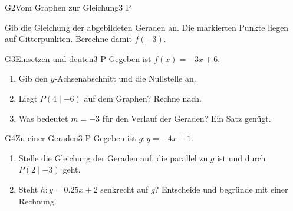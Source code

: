 \documentclass[11pt]{article}
\begin{document}
\begin{lpaufgabe}{G2}{Vom Graphen zur Gleichung}{3 P}
\begin{minipage}[t]{0.52\linewidth}
Gib die Gleichung der abgebildeten Geraden an. Die markierten Punkte liegen auf Gitterpunkten.
Berechne damit $f(-3)$.
\end{minipage}\hfill
\begin{minipage}[t]{0.42\linewidth}\vspace{0pt}\centering
{}
\end{minipage}
\end{lpaufgabe}

\begin{lpaufgabe}{G3}{Einsetzen und deuten}{3 P}
Gegeben ist $f(x) = -3x + 6$.
\begin{enumerate}[label=(\alph*),leftmargin=*,itemsep=1pt]
\item Gib den $y$-Achsenabschnitt und die Nullstelle an.
\item Liegt $P(4 \mid -6)$ auf dem Graphen? Rechne nach.
\item Was bedeutet $m = -3$ für den Verlauf der Geraden? Ein Satz genügt.
\end{enumerate}
\end{lpaufgabe}


\begin{lpaufgabe}{G4}{Zu einer Geraden}{3 P}
Gegeben ist $g: y = -4x + 1$.
\begin{enumerate}[label=(\alph*),leftmargin=*,itemsep=1pt]
\item Stelle die Gleichung der Geraden auf, die parallel zu $g$ ist und durch $P(2 \mid -3)$ geht.
\item Steht $h: y = 0.25x + 2$ senkrecht auf $g$? Entscheide und begründe mit einer Rechnung.
\end{enumerate}
\end{lpaufgabe}
\end{document}
